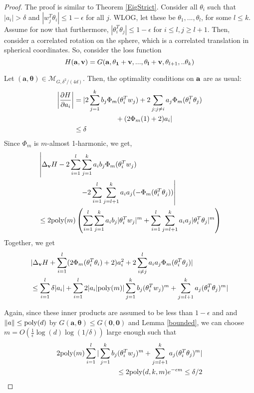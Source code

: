 \begin{proof}
  The proof is similar to Theorem \ref{EigStrict}. Consider all
  $\theta_i$ such that $|a_i| > \delta$ and
  $|w_j^T\theta_i| \leq 1-\epsilon$ for all $j$. WLOG, let these be
  $\theta_1,...,\theta_l$, for some $l \leq k$. Assume for now that
  furthermore, $|\theta_i^T\theta_j| \leq 1-\epsilon$ for
  $i \leq l, j\geq l+1$.  Then, consider a correlated rotation on the
  sphere, which is a correlated translation in spherical
  coordinates. So, consider the loss function 
%
\[ H({\bf a, v}) = G({\bf a,\theta_1+v,...,\theta_l+v},\theta_{l+1},..\theta_k)\]

Let $(\boldsymbol{a,\theta}) \in \mathcal{M}_{G, \delta^2/(4d)}$. Then,
the optimality conditions on ${\bf a}$ are as usual:
%
\begin{align*}
   \left| \frac{\partial H}{\partial a_i} \right| & = \lvert 2\sum_{j=1}^k b_j \Phi_m(\theta_i^T w_j) +
    2\sum_{j: j\neq i} a_j \Phi_m(\theta_i^T\theta_j) \\
& \qquad \qquad \qquad + (2\Phi_m(1) +
    2)a_i \rvert \\
& \leq \delta 
\end{align*}
%
Since $\Phi_m$ is $m$-almost 1-harmonic, we get,
%
\begin{align*}
  &  \left| \Delta_{{\bf v}} H -  2\sum_{i=1}^l\sum_{j=1}^k a_i b_j
    \Phi_m(\theta_i^Tw_j) \right. \\
& \qquad \qquad \qquad \left.- 2\sum_{i=1}^l\sum_{j= l+1}^k
  a_ia_j(-\Phi_m(\theta_i^T\theta_j)) \right| \\
  & \leq   2\mathrm{poly}(m)\left(\sum_{i=1}^l\sum_{j=1}^k a_i b_j  |\theta_i^Tw_j|^m+\sum_{i=1}^l\sum_{j= l+1}^k a_ia_j|\theta_i^T\theta_j|^m\right)
\end{align*}
%
Together, we get
%
\begin{align*}
& |\Delta_{{\bf v}}H + \sum_{i=1}^l (2\Phi_m(\theta_i^T\theta_i)+2)a_i^2 + 2\sum_{i \neq j}^l a_ia_j\Phi_m(\theta_i^T\theta_j)| \\
& \leq \sum_{i=1}^l\delta |a_i| +\sum_{i=1}^l 2|a_i|\mathrm{poly}(m)|\sum_{j=1}^k b_j
  (\theta_i^Tw_j)^m +  \sum_{j=l+1}^k  a_j(\theta_i^T\theta_j)^m|
\\
\end{align*}

Again, since these inner products are assumed to be less than
$1-\epsilon$ and and $\|a\| \leq \mathrm{poly}(d)$ by
$G(\boldsymbol{a,\theta}) \leq G(\boldsymbol{0,0})$ and Lemma
\ref{bounded}, we can choose
$m = O(\frac{1}{\epsilon}\log(d)\log(1/\delta))$ large enough such
that
%
\begin{align*}
 2\mathrm{poly}(m)\sum_{i=1}^l|\sum_{j=1}^k b_j (\theta_i^Tw_j)^m +
  \sum_{j=l+1}^k  a_j(\theta_i^T\theta_j)^m| \\
 \leq  2\mathrm{poly}(d,k,m)e^{-\epsilon m} \leq \delta/2
\end{align*}


\end{proof}
